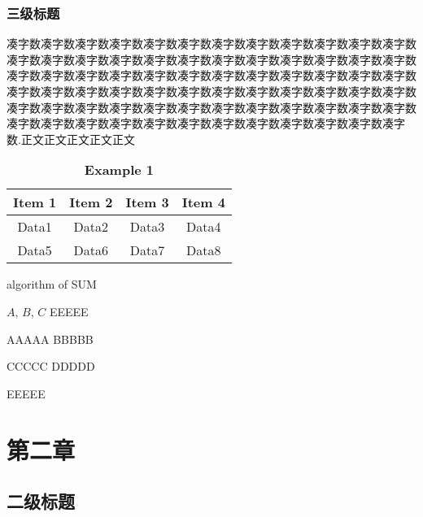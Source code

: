 \subsubsection{三级标题}
凑字数凑字数凑字数凑字数凑字数凑字数凑字数凑字数凑字数凑字数凑字数凑字数凑字数凑字数凑字数凑字数凑字数凑字数凑字数凑字数凑字数凑字数凑字数凑字数凑字数凑字数凑字数凑字数凑字数凑字数凑字数凑字数凑字数凑字数凑字数凑字数凑字数凑字数凑字数凑字数凑字数凑字数凑字数凑字数凑字数凑字数凑字数凑字数凑字数凑字数凑字数凑字数凑字数凑字数凑字数凑字数凑字数凑字数凑字数凑字数凑字数凑字数凑字数凑字数凑字数凑字数凑字数凑字数凑字数凑字数凑字数凑字数\textsuperscript{\cite{ref1}}.正文正文正文正文正文\par

\begin{table}[H]
    \caption{\textbf{Example 1}}%
    \centering%
    \begin{tabular}{cccc}%
    \toprule%
    Item 1&Item 2&Item 3&Item 4 \\
    \midrule%
    Data1&Data2&Data3&Data4 \\
    Data5&Data6&Data7&Data8 \\
    \bottomrule%
    \end{tabular}
\end{table}
\begin{algorithm}[!h]
    \caption{algorithm of SUM}
    \label{alg:AOA}
    \renewcommand{\algorithmicrequire}{\textbf{Input:}}
    \renewcommand{\algorithmicensure}{\textbf{Output:}}
    \begin{algorithmic}[1]
        \REQUIRE $A$, $B$, $C$  %
        \ENSURE EEEEE    %
        
        \STATE  AAAAA
            \STATE BBBBB
        \ENDWHILE
        
                \STATE CCCCC
            \ELSE
                \STATE DDDDD
            \ENDIF
        \ENDFOR
        
        \RETURN EEEEE
    \end{algorithmic}
\end{algorithm}
\section{第二章}
\subsection{二级标题}
